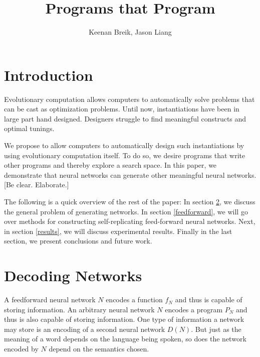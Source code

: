 \documentclass[12pt]{article}
\begin{document}
\title{Programs that Program}

\author{Keenan Breik, Jason Liang}
\date{}
\maketitle

\begin{abstract}
\end{abstract}

\section{Introduction}
\label{intro}

Evolutionary computation allows computers
to automatically solve problems
that can be cast as optimization problems.
Until now, instantiations have been
in large part hand designed.
Designers struggle to find meaningful constructs
and optimal tunings.

We propose to allow computers
to automatically design such instantiations
by using evolutionary computation itself.
To do so, we desire programs
that write other programs
and thereby explore a search space.
In this paper,
we demonstrate that neural networks
can generate other meaningful neural networks.
[Be clear. Elaborate.]


The following is a quick overview of the rest of the paper: In section \ref{problemstatement}, we discuss the general problem of generating networks. In section \ref{feedforward}, we will go over methods for constructing self-replicating feed-forward neural networks. Next, in section \ref{results}, we will discuss experimental results. Finally in the last section, we present conclusions and future work.

\section{Decoding Networks}
\label{problemstatement}

A feedforward neural network $N$ encodes a function $f_N$
and thus is capable of storing information.
An arbitrary neural network $N$ encodes a program $P_N$
and thus is also capable of storing information.
One type of information a network may store
is an encoding of a second neural network $D(N)$.
But just as the meaning of a word
depends on the language being spoken,
so does the network encoded by $N$
depend on the semantics chosen.
\end{document}
